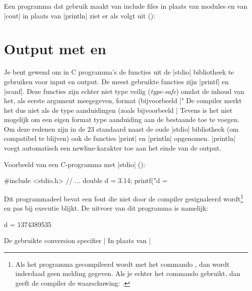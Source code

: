 \begin{cpplstShortInline}
Een  programma dat gebruik maakt van include files in plaats van modules en van |cout| in plaats van |println| ziet er als volgt uit ():

\section[Output met \texttt{print} en \texttt{println}]{Output met \texorpdfstring{}{print} en \texorpdfstring{}{println}}
\label{sec:print}
Je bent gewend om in C programma's de functies uit de |stdio| bibliotheek te gebruiken voor input en output.
De meest gebruikte functies zijn |printf| en |scanf|.
Deze functies zijn echter niet type veilig (\emph{type-safe}) omdat de inhoud van het, als eerste argument meegegeven, format (bijvoorbeeld |"%
De compiler merkt het dus niet als de type aanduidingen (zoals bijvoorbeeld |%
Tevens is het niet mogelijk om een eigen format type aanduiding aan de bestaande toe te voegen.
Om deze redenen zijn in de \Cpp{}23 standaard \cite{ISO2023} naast de oude |stdio| bibliotheek (om compatibel te blijven) ook de functies |print| en |println| opgenomen.
|println| voegt automatisch een newline-karakter toe aan het einde van de output.

Voorbeeld van een C-programma met |stdio| ():
\begin{lstfragment}[style=cstyle,mathescape=true]
#include <stdio.h>
//  ...
	double d = 3.14;
	printf("d = %
\end{lstfragment}

Dit programmadeel bevat een fout die niet door de compiler gesignaleerd wordt\footnote{%
	Als het programma gecompileerd wordt met het commando , dan wordt inderdaad geen melding gegeven. Als je echter het commando  gebruikt, dan geeft de compiler de waarschuwing: 
	.
} en pas bij executie blijkt.
De uitvoer van dit programma is namelijk:
\begin{coutput}
d = 1374389535
\end{coutput}
De gebruikte conversion specifier |%
In plaats van |%


\end{cpplstShortInline}
